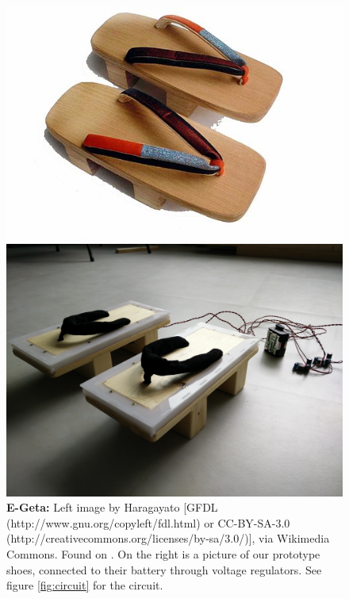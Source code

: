 \documentclass[oneside, a4paper, 12pt]{memoir}
\let\oldCaption\caption
\renewcommand{\caption}[2]{
\oldCaption[#1]{{\small\sffamily\bfseries #1:} #2}
}
\begin{document}

	
	\begin{figure}
		\begin{minipage}[c]{0.49\textwidth}
			\includegraphics[width=\textwidth]{images/512px-Geta.jpg}
		\end{minipage}
		\hfill
		\begin{minipage}[c]{0.49\textwidth}
			\includegraphics[width=\textwidth]{images/shoes2.jpg}
		\end{minipage}
		
		\caption{E-Geta}{Left image by Haragayato [GFDL (http://www.gnu.org/copyleft/fdl.html) or CC-BY-SA-3.0 (http://creativecommons.org/licenses/by-sa/3.0/)], via Wikimedia Commons. Found on \citet{wiki:001}. On the right is a picture of our prototype shoes, connected to their battery through voltage regulators. See figure \ref{fig:circuit} for the circuit.}
		\label{fig:e-geta}
	\end{figure}
	
\end{document}
